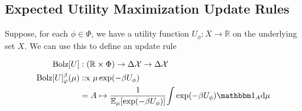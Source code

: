 \documentclass{article}
\begin{document}
\subsection{Expected Utility Maximization Update Rules}


%
%

\def\Bolz#1{\mathrm{Bolz}[#1]}


Suppose, for each $\phi \in \Phi$, we have a utility function $U_\phi : X \to \mathbb R$ on the underlying set $X$.
We can use this to define an update rule

\begin{align*}
	\Bolz U &: (\mathbb R \times \Phi) \to \Delta\X \to \Delta\X \\
	\Bolz U^\beta_\varphi(\mu)
		&:\propto
			\mu \exp(-\beta U_\phi) \\
		&= A \mapsto \frac
			1{\Ex_{\mu} [ \exp(-\beta U_\phi)]}
			{\int \exp(-\beta U_\phi) \mathbbm 1_A \mathrm d\mu }
\end{align*}
\end{document}
